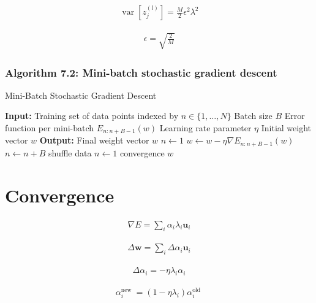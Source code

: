 \documentclass{article}
\begin{document}
\begin{align*}
\operatorname{var}\left[ z_{j}^{(l)}\right] =\frac{M}{2} \epsilon^{2} \lambda^{2}
\tag{7.22}
\end{align*}

\begin{align*}
\epsilon=\sqrt{\frac{2}{M}}
\tag{7.23}
\end{align*}

\subsubsection{Algorithm 7.2: Mini-batch stochastic gradient descent}

\begin{algorithm}
\caption{Mini-Batch Stochastic Gradient Descent}
\begin{algorithmic}[1]
\STATE \textbf{Input:} Training set of data points indexed by $n \in \{1, \ldots, N\}$
\STATE \quad Batch size $B$
\STATE \quad Error function per mini-batch $E_{n:n+B-1}(w)$
\STATE \quad Learning rate parameter $\eta$
\STATE \quad Initial weight vector $w$
\STATE \textbf{Output:} Final weight vector $w$
\STATE $n \gets 1$
\REPEAT
    \STATE $w \gets w - \eta \nabla E_{n:n+B-1}(w)$ 
    \STATE $n \gets n + B$
        \STATE shuffle data
        \STATE $n \gets 1$
    \ENDIF
\UNTIL convergence
\RETURN $w$
\end{algorithmic}
\end{algorithm}

\section{Convergence}

\begin{align*}
\nabla E=\sum_{i} \alpha_{i} \lambda_{i} \mathbf{u}_{i} 
\tag{7.24}
\end{align*}

\begin{align*}
\Delta \mathbf{w}=\sum_{i} \Delta \alpha_{i} \mathbf{u}_{i}
\tag{7.25}
\end{align*}

\begin{align*}
\Delta \alpha_{i}=-\eta \lambda_{i} \alpha_{i}
\tag{7.26}
\end{align*}

\begin{align*}
\alpha_{i}^{\text{new }}=\left(1-\eta \lambda_{i}\right) \alpha_{i}^{\text{old }}
\tag{7.27}
\end{align*}
\end{document}
